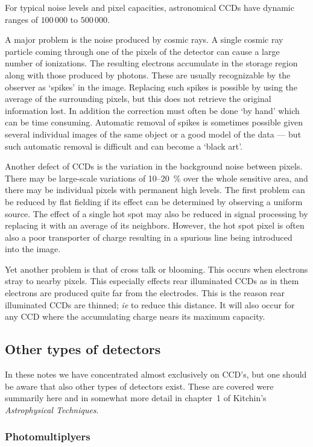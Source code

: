 For typical noise levels and pixel capacities, astronomical CCDs have dynamic
ranges of $100\,000$ to $500\,000$.

A major problem is the noise produced by cosmic rays. A single cosmic ray
particle coming through one of the pixels of the detector can cause a large
number of ionizations. The resulting electrons accumulate in the storage 
region along with those produced by photons. These are usually recognizable
by the observer as `spikes' in the image. Replacing such spikes is possible
by using the average of the surrounding pixels, but this does not retrieve 
the original information lost. In addition the correction must often be done
`by hand' which can be time consuming. Automatic removal of spikes is 
sometimes possible given several individual images of the same object or a 
good model of the data --- but such automatic removal is difficult and 
can become a `black art'. 

Another defect of CCDs is the variation in the background noise between 
pixels. There may be large-scale variations of 10--20~\% over the whole
sensitive area, and there may be individual pixels with permanent high levels.
The first problem can be reduced by flat fielding if its effect can be 
determined by observing a uniform source. The effect of a single hot spot
may also be reduced in signal processing by replacing it with an average of
its neighbors. However, the hot spot pixel is often also a poor transporter 
of charge resulting in a spurious line being introduced into the image.

Yet another problem is that of cross talk or blooming. This occurs when 
electrons stray to nearby pixels. This especially effects rear illuminated 
CCDs as in them electrons are produced quite far from the electrodes. This
is the reason rear illuminated CCDs are thinned; {\it ie} to reduce this 
distance. It will also occur for any CCD where the accumulating charge nears
its maximum capacity. 

\subsection{Other types of detectors}

In these notes we have concentrated almost exclusively on CCD's, but one should
be aware that also other types of detectors exist. These are covered were
summarily here and in somewhat more detail in chapter~1 of Kitchin's 
{\it Astrophysical Techniques}.

\subsubsection{Photomultiplyers}

